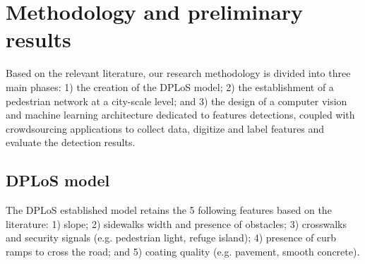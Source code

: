 \documentclass[10pt,conference,a4paper]{IEEEtran}
\begin{document}





\section{Methodology and preliminary results}
Based on the relevant literature, our research methodology is divided into three main phases: 1) the creation of the DPLoS model; 2) the establishment of a pedestrian network at a city-scale level; and 3) the design of a computer vision and machine learning architecture dedicated to features detections, coupled with crowdsourcing applications to collect data, digitize and label features and evaluate the detection results.

\subsection{DPLoS model}


The DPLoS established model retains the 5 following features based on the literature: 1) slope; 2) sidewalks width and presence of obstacles; 3) crosswalks and security signals (e.g. pedestrian light, refuge island); 4) presence of curb ramps to cross the road; and 5) coating quality (e.g. pavement, smooth concrete).

\end{document}

